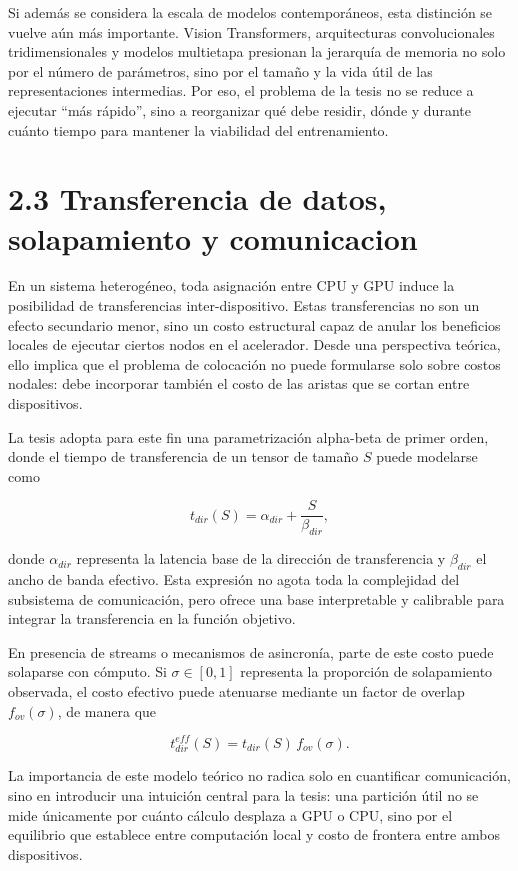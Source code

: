 Si además se considera la escala de modelos contemporáneos, esta distinción se vuelve aún más importante. Vision Transformers, arquitecturas convolucionales tridimensionales y modelos multietapa presionan la jerarquía de memoria no solo por el número de parámetros, sino por el tamaño y la vida útil de las representaciones intermedias. Por eso, el problema de la tesis no se reduce a ejecutar ``más rápido'', sino a reorganizar qué debe residir, dónde y durante cuánto tiempo para mantener la viabilidad del entrenamiento.

\section{2.3 Transferencia de datos, solapamiento y comunicacion}
En un sistema heterogéneo, toda asignación entre CPU y GPU induce la posibilidad de transferencias inter-dispositivo. Estas transferencias no son un efecto secundario menor, sino un costo estructural capaz de anular los beneficios locales de ejecutar ciertos nodos en el acelerador. Desde una perspectiva teórica, ello implica que el problema de colocación no puede formularse solo sobre costos nodales: debe incorporar también el costo de las aristas que se cortan entre dispositivos.

La tesis adopta para este fin una parametrización alpha-beta de primer orden, donde el tiempo de transferencia de un tensor de tamaño $S$ puede modelarse como

$$
t_{dir}(S) = \alpha_{dir} + \frac{S}{\beta_{dir}},
$$

donde $\alpha_{dir}$ representa la latencia base de la dirección de transferencia y $\beta_{dir}$ el ancho de banda efectivo. Esta expresión no agota toda la complejidad del subsistema de comunicación, pero ofrece una base interpretable y calibrable para integrar la transferencia en la función objetivo.

En presencia de streams o mecanismos de asincronía, parte de este costo puede solaparse con cómputo. Si $\sigma \in [0,1]$ representa la proporción de solapamiento observada, el costo efectivo puede atenuarse mediante un factor de overlap $f_{ov}(\sigma)$, de manera que

$$
t^{eff}_{dir}(S) = t_{dir}(S)\, f_{ov}(\sigma).
$$

La importancia de este modelo teórico no radica solo en cuantificar comunicación, sino en introducir una intuición central para la tesis: una partición útil no se mide únicamente por cuánto cálculo desplaza a GPU o CPU, sino por el equilibrio que establece entre computación local y costo de frontera entre ambos dispositivos.


